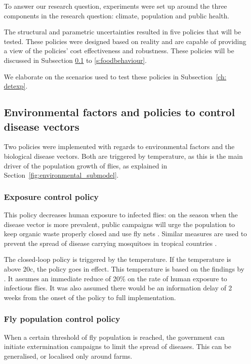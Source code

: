 
To answer our research question, experiments were set up around the three components in the research question: climate, population and public health. 

The structural and parametric uncertainties resulted in five policies that will be tested. These policies were designed based on reality and are capable of providing a view of the policies' cost effectiveness and robustness. These policies will be discussed in Subsection \ref{s:environmentalfactors} to \ref{s:foodbehaviour}. 

We elaborate on the scenarios used to test these policies in Subsection~\ref{ch: detexp}.

\subsection{Environmental factors and policies to control disease vectors}
\label{s:environmentalfactors}
Two policies were implemented with regards to environmental factors and the biological disease vectors. Both are triggered by temperature, as this is the main driver of the population growth of flies, as explained in Section~\ref{fig:environmental_submodel}.

\subsubsection{Exposure control policy}
This policy decreases human exposure to infected flies: on the season when the disease vector is more prevalent, public campaigns will urge the population to keep organic waste properly closed and use fly nets \parencite{hald_use_2007}. Similar measures are used to prevent the spread of disease carrying mosquitoes in tropical countries \parencite{govella_why_2012}. %

The closed-loop policy is triggered by the temperature. If the temperature is above 20\degree c, the policy goes in effect. This temperature is based on the findings by \cite{schou_temperature_2013}. It assumes an immediate reduce of 20\% on the rate of human exposure to infectious flies. It was also assumed there would be an information delay of 2 weeks from the onset of the policy to full implementation.

\subsubsection{Fly population control policy}
When a certain threshold of fly population is reached, the government can initiate extermination campaigns to limit the spread of diseases. This can be generalised, or localised only around farms.

